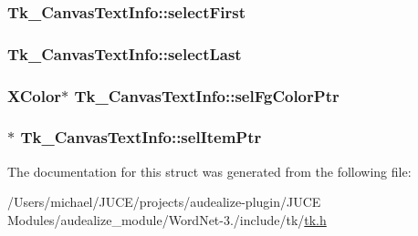 \subsubsection[{\texorpdfstring{select\+First}{selectFirst}}]{ Tk\+\_\+\+Canvas\+Text\+Info\+::select\+First}\hypertarget{struct_tk___canvas_text_info_a59c9b66d8b3525a8c1003f47958501f5}{}\label{struct_tk___canvas_text_info_a59c9b66d8b3525a8c1003f47958501f5}
\subsubsection[{\texorpdfstring{select\+Last}{selectLast}}]{ Tk\+\_\+\+Canvas\+Text\+Info\+::select\+Last}\hypertarget{struct_tk___canvas_text_info_a22c8153c3204404b935ce2a4da70a057}{}\label{struct_tk___canvas_text_info_a22c8153c3204404b935ce2a4da70a057}
\subsubsection[{\texorpdfstring{sel\+Fg\+Color\+Ptr}{selFgColorPtr}}]{\setlength{\rightskip}{0pt plus 5cm}X\+Color$\ast$ Tk\+\_\+\+Canvas\+Text\+Info\+::sel\+Fg\+Color\+Ptr}\hypertarget{struct_tk___canvas_text_info_a9c085ae5c3bf346fd3a7030d90a7434e}{}\label{struct_tk___canvas_text_info_a9c085ae5c3bf346fd3a7030d90a7434e}
\subsubsection[{\texorpdfstring{sel\+Item\+Ptr}{selItemPtr}}]{$\ast$ Tk\+\_\+\+Canvas\+Text\+Info\+::sel\+Item\+Ptr}\hypertarget{struct_tk___canvas_text_info_a65a86c6ba06d36ac5568fb31418d2db8}{}\label{struct_tk___canvas_text_info_a65a86c6ba06d36ac5568fb31418d2db8}


The documentation for this struct was generated from the following file\+:\begin{DoxyCompactItemize}
\item 
/\+Users/michael/\+J\+U\+C\+E/projects/audealize-\/plugin/\+J\+U\+C\+E Modules/audealize\+\_\+module/\+Word\+Net-\/3./include/tk/\hyperlink{tk_8h}{tk.\+h}\end{DoxyCompactItemize}

